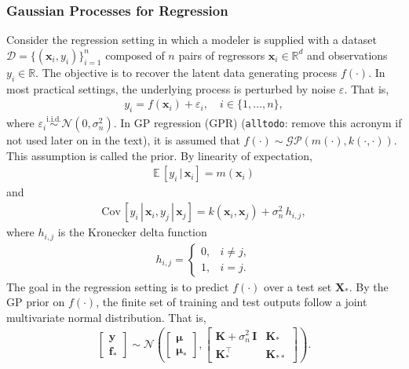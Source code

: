 \documentclass[journal=jacsat,manuscript=article, ]{achemso}
\newcommand{\alltodo}[1]{{\color{Cyan} (\texttt{alltodo}: #1)}}
\newcommand{\reals}{\ensuremath{\mathbb{R}}}
\newcommand{\xvec}{\ensuremath{\mathbf{x}}}
\newcommand{\xmatrix}{\ensuremath{\mathbf{X}}}
\begin{document}
 \subsubsection{Gaussian Processes for Regression}
 Consider the regression setting in which a modeler is supplied with a dataset $\mathcal{D} = \{(\xvec_i, y_i)\}_{i=1}^n$ composed of $n$ pairs of regressors $\xvec_i \in \reals^d$ and observations $y_i \in \reals$. The objective is to recover the latent data generating process $f(\cdot)$. In most practical settings, the underlying process is perturbed by noise $\varepsilon$. That is,
 \begin{gather*}
     y_i = f(\xvec_i) + \varepsilon_i, \quad i \in \{1,\dots, n\},
 \end{gather*}
 where $\varepsilon_i \stackrel{\text{i.i.d.}}{\sim} \mathcal{N}(0,\sigma_n^2)$. In GP regression (GPR) \alltodo{remove this acronym if not used later on in the text}, it is assumed that $f(\cdot)\sim \mathcal{GP}(m(\cdot),k(\cdot,\cdot))$. This assumption is called the prior. By linearity of expectation,
 \begin{gather*}
     \mathbb{E}\,[y_i\,|\,\xvec_i] = m(\xvec_i)
 \end{gather*}
 and
 \begin{gather*}
     \text{Cov}\,[y_i\, | \,\xvec_i, y_j \, | \,\xvec_j] = k(\xvec_i, \xvec_j) + \sigma_n^2 \,h_{i,j},
 \end{gather*}
 where $h_{i,j}$ is the Kronecker delta function
 \begin{gather*}
     h_{i,j} = 
     \begin{cases}
         0, & i\neq j,\\
         1, & i= j.
     \end{cases}
 \end{gather*}
 The goal in the regression setting is to predict $f(\cdot)$ over a test set $\xmatrix_*$. By the GP prior on $f(\cdot)$, the finite set of training and test outputs follow a joint multivariate normal distribution. That is,
 \begin{gather*}
     \begin{bmatrix}
         \mathbf{y} \\
         \mathbf{f}_*
     \end{bmatrix}
     \sim 
     \mathcal{N}\left(
     \begin{bmatrix}
         \boldsymbol{\mu}\\
         \boldsymbol{\mu}_*
     \end{bmatrix},
     \begin{bmatrix}
         \mathbf{K} +\sigma_n^2\,\mathbf{I} & \mathbf{K}_* \\
         \mathbf{K}^\intercal_* & \mathbf{K}_{**}
     \end{bmatrix} \right).
 \end{gather*}
\end{document}
